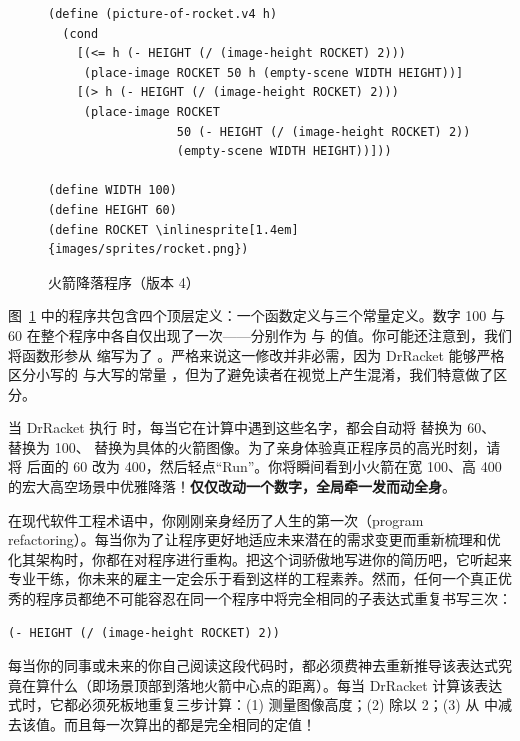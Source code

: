 \begin{figure}[htbp]
  \centering
\begin{stepperbox}[unbreakable]
\begin{Verbatim}[commandchars=\\\{\}, fontsize=\scriptsize]
(define (picture-of-rocket.v4 h)
  (cond
    [(<= h (- HEIGHT (/ (image-height ROCKET) 2)))
     (place-image ROCKET 50 h (empty-scene WIDTH HEIGHT))]
    [(> h (- HEIGHT (/ (image-height ROCKET) 2)))
     (place-image ROCKET
                  50 (- HEIGHT (/ (image-height ROCKET) 2))
                  (empty-scene WIDTH HEIGHT))]))

(define WIDTH 100)
(define HEIGHT 60)
(define ROCKET \inlinesprite[1.4em]{images/sprites/rocket.png})
\end{Verbatim}
\end{stepperbox}
  \caption{火箭降落程序（版本 4）}
  \label{fig:rocket_v4}
\end{figure}

图~\ref{fig:rocket_v4} 中的程序共包含四个顶层定义：一个函数定义与三个常量定义。数字 100 与 60 在整个程序中各自仅出现了一次——分别作为  与  的值。你可能还注意到，我们将函数形参从  缩写为了 。严格来说这一修改并非必需，因为 DrRacket 能够严格区分小写的  与大写的常量 ，但为了避免读者在视觉上产生混淆，我们特意做了区分。

当 DrRacket 执行  时，每当它在计算中遇到这些名字，都会自动将  替换为 60、 替换为 100、 替换为具体的火箭图像。为了亲身体验真正程序员的高光时刻，请将  后面的 60 改为 400，然后轻点“Run”。你将瞬间看到小火箭在宽 100、高 400 的宏大高空场景中优雅降落！\textbf{仅仅改动一个数字，全局牵一发而动全身}。

在现代软件工程术语中，你刚刚亲身经历了人生的第一次（program refactoring）。每当你为了让程序更好地适应未来潜在的需求变更而重新梳理和优化其架构时，你都在对程序进行重构。把这个词骄傲地写进你的简历吧，它听起来专业干练，你未来的雇主一定会乐于看到这样的工程素养。然而，任何一个真正优秀的程序员都绝不可能容忍在同一个程序中将完全相同的子表达式重复书写三次：
\begin{lstlisting}[language=BSL]
(- HEIGHT (/ (image-height ROCKET) 2))
\end{lstlisting}

每当你的同事或未来的你自己阅读这段代码时，都必须费神去重新推导该表达式究竟在算什么（即场景顶部到落地火箭中心点的距离）。每当 DrRacket 计算该表达式时，它都必须死板地重复三步计算：(1) 测量图像高度；(2) 除以 2；(3) 从  中减去该值。而且每一次算出的都是完全相同的定值！

